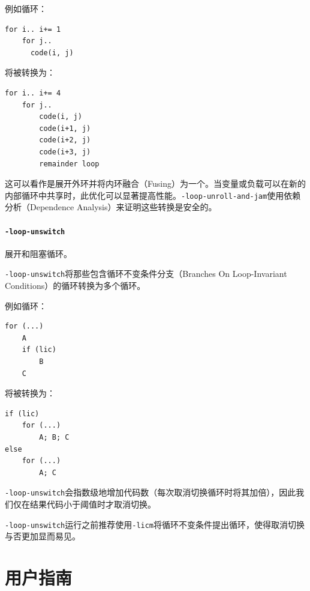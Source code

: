 \documentclass[lang=cn,11pt,a4paper,cite=authornum]{paper}
\begin{document}
例如循环：

\begin{code}
    \begin{verbatim}
for i.. i+= 1
    for j..
      code(i, j)    
\end{verbatim}
\end{code}

将被转换为：

\begin{code}
    \begin{verbatim}
for i.. i+= 4
    for j..
        code(i, j)
        code(i+1, j)
        code(i+2, j)
        code(i+3, j)
        remainder loop
\end{verbatim}
\end{code}

这可以看作是展开外环并将内环融合（Fusing）为一个。当变量或负载可以在新的内部循环中共享时，此优化可以显著提高性能。\texttt{-loop-unroll-and-jam}使用依赖分析（Dependence Analysis）来证明这些转换是安全的。

\paragraph{\texttt{-loop-unswitch}} 展开和阻塞循环。

\texttt{-loop-unswitch}将那些包含循环不变条件分支（Branches On Loop-Invariant Conditions）的循环转换为多个循环。

例如循环：

\begin{code}
    \begin{verbatim}
for (...)    
    A        
    if (lic) 
        B    
    C        
\end{verbatim}
\end{code}

将被转换为：

\begin{code}
    \begin{verbatim}
if (lic)
    for (...)
        A; B; C
else
    for (...)
        A; C
\end{verbatim}
\end{code}

\texttt{-loop-unswitch}会指数级地增加代码数（每次取消切换循环时将其加倍），因此我们仅在结果代码小于阈值时才取消切换。

\texttt{-loop-unswitch}运行之前推荐使用\texttt{-licm}将循环不变条件提出循环，使得取消切换与否更加显而易见。

\section{用户指南}
\end{document}
